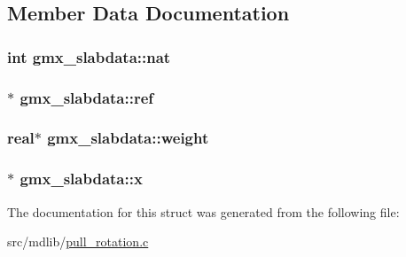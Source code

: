 \subsection{\-Member \-Data \-Documentation}
\hypertarget{structgmx__slabdata_a7855792b602b1193fb5e3786fe1055cd}{
\subsubsection[{nat}]{\setlength{\rightskip}{0pt plus 5cm}int {\bf gmx\-\_\-slabdata\-::nat}}}\label{structgmx__slabdata_a7855792b602b1193fb5e3786fe1055cd}
\hypertarget{structgmx__slabdata_a38412c998c5ba1354af37003486baf1e}{
\subsubsection[{ref}]{$\ast$ {\bf gmx\-\_\-slabdata\-::ref}}}\label{structgmx__slabdata_a38412c998c5ba1354af37003486baf1e}
\hypertarget{structgmx__slabdata_a710d6be23a5f67c250f9491a8260dfd7}{
\subsubsection[{weight}]{\setlength{\rightskip}{0pt plus 5cm}real$\ast$ {\bf gmx\-\_\-slabdata\-::weight}}}\label{structgmx__slabdata_a710d6be23a5f67c250f9491a8260dfd7}
\hypertarget{structgmx__slabdata_a1551510842bf666c0e790aff87dea9f1}{
\subsubsection[{x}]{$\ast$ {\bf gmx\-\_\-slabdata\-::x}}}\label{structgmx__slabdata_a1551510842bf666c0e790aff87dea9f1}


\-The documentation for this struct was generated from the following file\-:\begin{DoxyCompactItemize}
\item 
src/mdlib/\hyperlink{pull__rotation_8c}{pull\-\_\-rotation.\-c}\end{DoxyCompactItemize}
